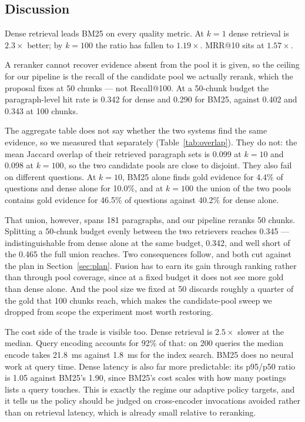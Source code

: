 \documentclass[sigconf,nonacm]{acmart}
\begin{document}
\subsection{Discussion}

Dense retrieval leads BM25 on every quality metric. At $k = 1$ dense retrieval
is $2.3\times$ better; by $k = 100$ the ratio has fallen to $1.19\times$. MRR@10
sits at $1.57\times$.

A reranker cannot recover evidence absent from the pool it is given, so the
ceiling for our pipeline is the recall of the candidate pool we actually rerank,
which the proposal fixes at 50 chunks --- not Recall@100. At a 50-chunk budget
the paragraph-level hit rate is 0.342 for dense and 0.290 for BM25, against
0.402 and 0.343 at 100 chunks.

The aggregate table does not say whether the two systems find the same evidence,
so we measured that separately (Table~\ref{tab:overlap}). They do not: the mean
Jaccard overlap of their retrieved paragraph sets is 0.099 at $k = 10$ and 0.098
at $k = 100$, so the two candidate pools are close to disjoint. They also fail on
different questions. At $k = 10$, BM25 alone finds gold evidence for 4.4\% of
questions and dense alone for 10.0\%, and at $k = 100$ the union of the two pools
contains gold evidence for 46.5\% of questions against 40.2\% for dense alone.

That union, however, spans 181 paragraphs, and our pipeline reranks 50 chunks.
Splitting a 50-chunk budget evenly between the two retrievers reaches 0.345 ---
indistinguishable from dense alone at the same budget, 0.342, and well short of
the 0.465 the full union reaches. Two consequences follow, and both cut against
the plan in Section~\ref{sec:plan}. Fusion has to earn its gain through ranking
rather than through pool coverage, since at a fixed budget it does not see more
gold than dense alone. And the pool size we fixed at 50 discards roughly a
quarter of the gold that 100 chunks reach, which makes the candidate-pool sweep
we dropped from scope the experiment most worth restoring.

The cost side of the trade is visible too. Dense retrieval is $2.5\times$ slower
at the median. Query encoding accounts for 92\% of that: on 200 queries the
median encode takes 21.8~ms against 1.8~ms for the index search. BM25 does no
neural work at query time. Dense latency is also far more predictable: its p95/p50 ratio
is 1.05 against BM25's 1.90, since BM25's cost scales with how many postings
lists a query touches. This is exactly the regime our adaptive policy targets, and
it tells us the policy should be judged on cross-encoder invocations avoided
rather than on retrieval latency, which is already small relative to reranking.
\end{document}
